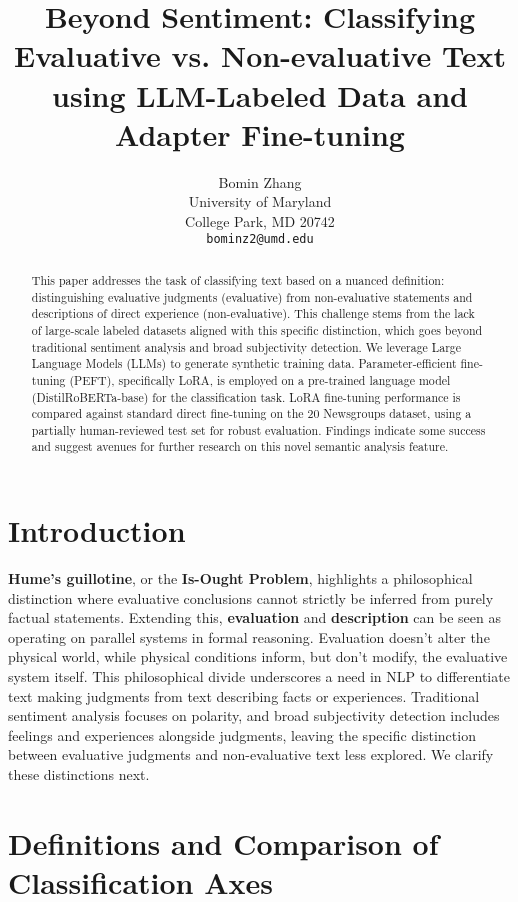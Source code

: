 \documentclass{article}
\title{Beyond Sentiment: Classifying Evaluative vs. Non-evaluative Text using LLM-Labeled Data and Adapter Fine-tuning}
\author{%
Bomin Zhang\\
University of Maryland \\ %
College Park, MD 20742 \\
\texttt{bominz2@umd.edu} \\
}
\begin{document}
\maketitle

\begin{abstract}
This paper addresses the task of classifying text based on a nuanced definition: distinguishing evaluative judgments (evaluative) from non-evaluative statements and descriptions of direct experience (non-evaluative). This challenge stems from the lack of large-scale labeled datasets aligned with this specific distinction, which goes beyond traditional sentiment analysis and broad subjectivity detection. We leverage Large Language Models (LLMs) to generate synthetic training data. Parameter-efficient fine-tuning (PEFT), specifically LoRA, is employed on a pre-trained language model (DistilRoBERTa-base) for the classification task. LoRA fine-tuning performance is compared against standard direct fine-tuning on the 20 Newsgroups dataset, using a partially human-reviewed test set for robust evaluation. Findings indicate some success and suggest avenues for further research on this novel semantic analysis feature.
\end{abstract}


\section{Introduction}
\label{sec:introduction}

\textbf{Hume's guillotine}, or the \textbf{Is-Ought Problem}, highlights a philosophical distinction where evaluative conclusions cannot strictly be inferred from purely factual statements. Extending this, \textbf{evaluation} and \textbf{description} can be seen as operating on parallel systems in formal reasoning. Evaluation doesn't alter the physical world, while physical conditions inform, but don't modify, the evaluative system itself. This philosophical divide underscores a need in NLP to differentiate text making judgments from text describing facts or experiences. Traditional sentiment analysis focuses on polarity, and broad subjectivity detection includes feelings and experiences alongside judgments, leaving the specific distinction between evaluative judgments and non-evaluative text less explored. We clarify these distinctions next.

\section{Definitions and Comparison of Classification Axes}
\label{sec:definitions_comparison}
\end{document}
